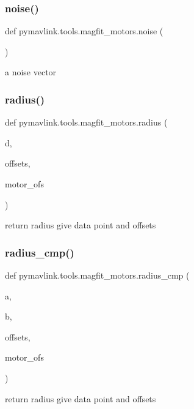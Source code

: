 \subsubsection{\texorpdfstring{noise()}{noise()}}
{\footnotesize\ttfamily def pymavlink.\+tools.\+magfit\+\_\+motors.\+noise (\begin{DoxyParamCaption}{ }\end{DoxyParamCaption})}

\begin{DoxyVerb}a noise vector\end{DoxyVerb}
 \mbox{\label{namespacepymavlink_1_1tools_1_1magfit__motors_a7251ec199a4f359bc17d4a45827cfd58}} 
\subsubsection{\texorpdfstring{radius()}{radius()}}
{\footnotesize\ttfamily def pymavlink.\+tools.\+magfit\+\_\+motors.\+radius (\begin{DoxyParamCaption}\item[{}]{d,  }\item[{}]{offsets,  }\item[{}]{motor\+\_\+ofs }\end{DoxyParamCaption})}

\begin{DoxyVerb}return radius give data point and offsets\end{DoxyVerb}
 \mbox{\label{namespacepymavlink_1_1tools_1_1magfit__motors_aa6e80f814cf0800c2263a28e37fc849f}} 
\subsubsection{\texorpdfstring{radius\+\_\+cmp()}{radius\_cmp()}}
{\footnotesize\ttfamily def pymavlink.\+tools.\+magfit\+\_\+motors.\+radius\+\_\+cmp (\begin{DoxyParamCaption}\item[{}]{a,  }\item[{}]{b,  }\item[{}]{offsets,  }\item[{}]{motor\+\_\+ofs }\end{DoxyParamCaption})}

\begin{DoxyVerb}return radius give data point and offsets\end{DoxyVerb}
 